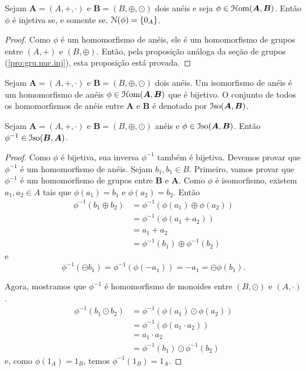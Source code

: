 \begin{prop}
\label{pro:ane.nuc.inj}
	Sejam $\bm A=(A,+,\cdot)$ e $\bm B=(B,\oplus,\odot)$ dois anéis e seja $\phi \in \mathcal{H}\mathrm{om}(\bm A,\bm B)$. Então $\phi$ é injetiva se, e somente se, $\mathcal{N}(\phi)=\{0_A\}$.
\end{prop}
\begin{proof}
	Como $\phi$ é um homomorfismo de anéis, ele é um homomorfismo de grupos entre $(A,+)$ e $(B,\oplus)$. Então, pela proposição análoga da seção de grupos (\ref{pro:gru.nuc.inj}), esta proposição está provada.
\end{proof}

\begin{defi}
	Sejam $\bm A=(A,+,\cdot)$ e $\bm B=(B,\oplus,\odot)$ dois anéis. Um isomorfismo de anéis é um homomorfismo de anéis $\phi \in \mathcal{H}\mathrm{om}(\bm A,\bm B)$ que é bijetivo. O conjunto de todos os homomorfismos de anéis entre $\bm A$ e $\bm B$ é denotado por $\mathcal{I}\mathrm{so}(\bm A,\bm B)$.
\end{defi}

\begin{prop}
\label{prop:iso.inv}
	Sejam $\bm A=(A,+,\cdot)$ e $\bm B=(B,\oplus,\odot)$ anéis e $\phi \in \mathcal{I}\mathrm{so}(\bm A,\bm B)$. Então $\phi^{-1} \in \mathcal{I}\mathrm{so}(\bm B,\bm A)$.
\end{prop}
\begin{proof}
	Como $\phi$ é bijetiva, sua inversa $\phi^{-1}$ também é bijetiva. Devemos provar que $\phi^{-1}$ é um homomorfismo de anéis. Sejam $b_1,b_1 \in B$. Primeiro, vamos provar que $\phi^{-1}$ é um homomorfismo de grupos entre $\bm B$ e $\bm A$. Como $\phi$ é isomorfismo, existem $a_1,a_2 \in A$ tais que $\phi(a_1)=b_1$ e $\phi(a_2)=b_2$. Então
	\begin{align*}
	\phi^{-1}(b_1 \oplus b_2) &= \phi^{-1}(\phi(a_1) \oplus \phi(a_2)) \\
		&= \phi^{-1}(\phi(a_1+a_2)) \\
		&= a_1+a_2 \\
		&= \phi^{-1}(b_1) \oplus \phi^{-1}(b_2)
	\end{align*}
e
	\begin{equation*}
	\phi^{-1}(\ominus b_1) = \phi^{-1}(\phi(-a_1)) = -a_1 = \ominus \phi(b_1).
	\end{equation*}

	Agora, mostramos que $\phi^{-1}$ é homomorfismo de monoides entre $(B,\odot)$ e $(A,\cdot)$.
	\begin{align*}
	\phi^{-1}(b_1 \odot b_2) &= \phi^{-1}(\phi(a_1) \odot \phi(a_2)) \\
		&= \phi^{-1}(\phi(a_1 \cdot a_2)) \\
		&= a_1 \cdot a_2 \\
		&= \phi^{-1}(b_1) \odot \phi^{-1}(b_2)
	\end{align*}
e, como $\phi(1_A)=1_B$, temos $\phi^{-1}(1_B)=1_A$.
\end{proof}

